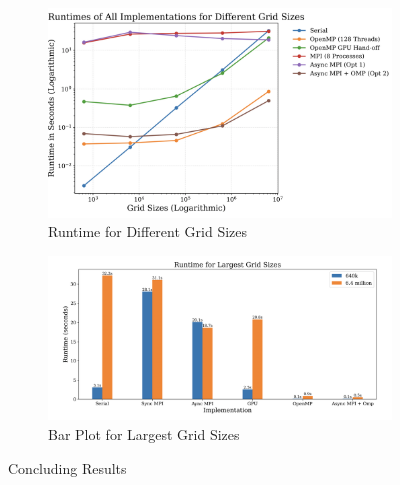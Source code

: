 \documentclass[a4paper,10pt]{article}
\begin{document}
\begin{figure}[H]
     \centering
     \begin{subfigure}[b]{0.45\textwidth}
         \centering
         \includegraphics[width=\textwidth]{../images/final_everything_plot.png}
         \caption{Runtime for Different Grid Sizes}
         \label{fig:conclusion_line_plot}
     \end{subfigure}
     \hfill
     \begin{subfigure}[b]{0.45\textwidth}
         \centering
         \includegraphics[width=\textwidth]{../images/final_everything_bar.png}
         \caption{Bar Plot for Largest Grid Sizes}
         \label{fig:conclusion_bar_graph}
     \end{subfigure}
     \caption{Concluding Results}
     \label{fig:conclusion}
\end{figure}
\end{document}
